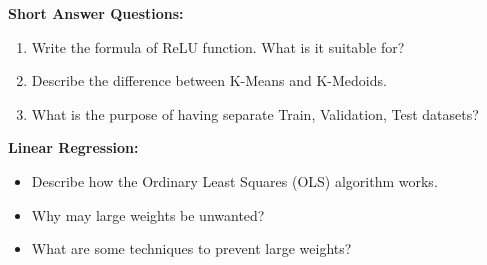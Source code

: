 \begin{problem} \textbf{Short Answer Questions:}

\begin{enumerate}
    
    \item Write the formula of ReLU function. What is it suitable for?

    \item 
Describe the difference between K-Means and K-Medoids.

    \item 
What is the purpose of having separate Train, Validation, Test datasets?

\end{enumerate}
    
\end{problem}




\begin{problem}
    \textbf{Linear Regression:}

\begin{itemize}
    \item Describe how the Ordinary Least Squares (OLS) algorithm works.
    
    \item Why may large weights be unwanted?

    \item What are some techniques to prevent large weights?
\end{itemize}
\end{problem}


